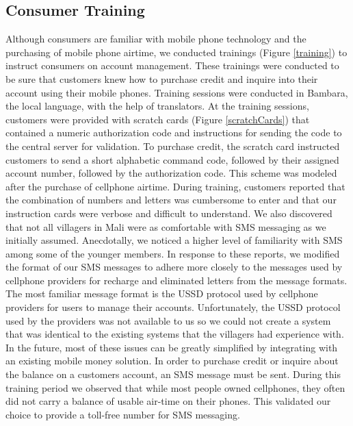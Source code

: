 \documentclass{sig-alternate}
\begin{document}
\subsection{Consumer Training}
Although consumers are familiar with mobile phone technology and the
purchasing of mobile phone airtime, we conducted trainings (Figure \ref{training})
to instruct consumers on account management.
These trainings were conducted to be sure that customers knew how to
purchase credit and inquire into their account using their mobile
phones.
Training sessions were conducted in Bambara, the local language, with
the help of translators.
At the training sessions, customers were provided with scratch cards (Figure
\ref{scratchCards}) that contained a numeric authorization code and
instructions for sending the code to the central server for
validation.
To purchase credit, the scratch card instructed customers to send a
short alphabetic command code, followed by their assigned account
number, followed by the authorization code.
This scheme was modeled after the purchase of cellphone airtime.
During training, customers reported that the combination of numbers and letters was
cumbersome to enter and that our instruction cards were verbose and
difficult to understand.
We also discovered that not all villagers in Mali were as
comfortable with SMS messaging as we initially assumed.
Anecdotally, we noticed a higher level of familiarity with SMS
among some of the younger members.
In response to these reports, we modified the format of our SMS messages
to adhere more closely to the messages used by cellphone providers for
recharge and eliminated letters from the message formats.
The most familiar message format is the USSD protocol used by
cellphone providers for users to manage their accounts.
Unfortunately, the USSD protocol used by the providers was not available
to us so we could not create a system that was identical to the existing
systems that the villagers had experience with.
In the future, most of these issues can be greatly simplified by integrating
with an existing mobile money solution.
In order to purchase credit or inquire about the balance on a customers
account, an SMS message must be sent.
During this training period we observed that while most people owned
cellphones, they often did not carry a balance of usable air-time on
their phones.
This validated our choice to provide a toll-free number for SMS messaging.
\end{document}
